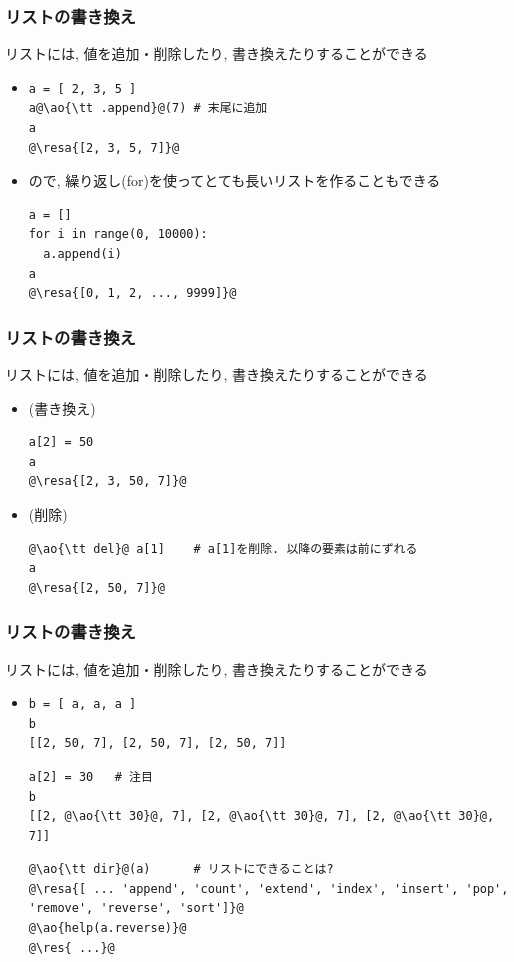 \documentclass[10pt,dvipdfmx]{beamer}
\newcommand{\ore}[1]{{\color{orange}#1}}
\newcommand{\ao}[1]{{\color{blue}#1}}
\newcommand{\resa}[1]{\ore{\textsl{$\rightarrow$ #1}}}
\newcommand{\res}[1]{\ore{\textsl{#1}}}
\begin{document}
\begin{frame}[fragile]
\frametitle{リストの書き換え}
リストには, 値を追加・削除したり, 書き換えたりすることができる
\begin{itemize}
\item []
\begin{lstlisting}
a = [ 2, 3, 5 ]
a@\ao{\tt .append}@(7) # 末尾に追加
a
@\resa{[2, 3, 5, 7]}@
\end{lstlisting}
\item []
ので, 繰り返し(for)を使ってとても長いリストを作ることもできる
\begin{lstlisting}
a = []
for i in range(0, 10000):
  a.append(i)
a
@\resa{[0, 1, 2, ..., 9999]}@  
\end{lstlisting}
\end{itemize}
\end{frame}

\begin{frame}[fragile]
\frametitle{リストの書き換え}
リストには, 値を追加・削除したり, 書き換えたりすることができる
\begin{itemize}
\item [] (書き換え)
\begin{lstlisting}
a[2] = 50
a
@\resa{[2, 3, 50, 7]}@
\end{lstlisting}
\item [] (削除)
\begin{lstlisting}
@\ao{\tt del}@ a[1]    # a[1]を削除. 以降の要素は前にずれる
a
@\resa{[2, 50, 7]}@
\end{lstlisting}
\end{itemize}
\end{frame}


\begin{frame}[fragile]
\frametitle{リストの書き換え}
リストには, 値を追加・削除したり, 書き換えたりすることができる
\begin{itemize}
\item []
\begin{lstlisting}
b = [ a, a, a ]
b
[[2, 50, 7], [2, 50, 7], [2, 50, 7]]
\end{lstlisting}
\begin{lstlisting}
a[2] = 30   # 注目
b
[[2, @\ao{\tt 30}@, 7], [2, @\ao{\tt 30}@, 7], [2, @\ao{\tt 30}@, 7]]
\end{lstlisting}
\begin{lstlisting}
@\ao{\tt dir}@(a)      # リストにできることは?
@\resa{[ ... 'append', 'count', 'extend', 'index', 'insert', 'pop', 'remove', 'reverse', 'sort']}@
@\ao{help(a.reverse)}@
@\res{ ...}@
\end{lstlisting}
\end{itemize}
\end{frame}
\end{document}
